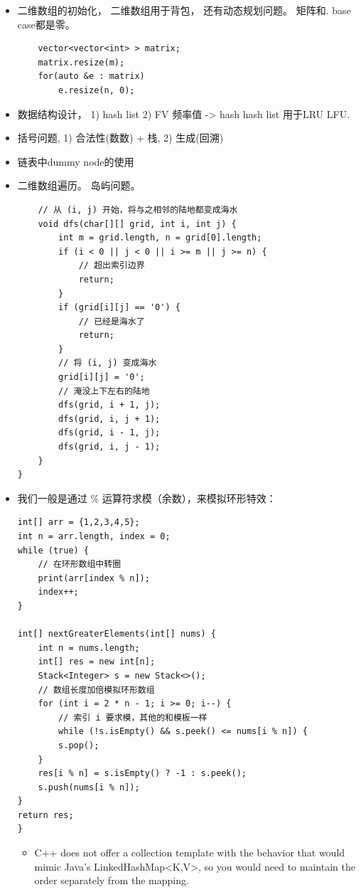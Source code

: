 \documentclass[a4paper,11pt,twoside]{book}
\begin{document}
\begin{itemize}
	\item 二维数组的初始化， 二维数组用于背包， 还有动态规划问题。 矩阵和. base case都是零。

\begin{lstlisting}
	vector<vector<int> > matrix;
	matrix.resize(m);
	for(auto &e : matrix)
		e.resize(n, 0);
\end{lstlisting}

	\item 数据结构设计， 1) hash list 2) FV 频率值 -> hash  hash list 用于LRU LFU. 
	
	\item 括号问题, 1) 合法性(数数) + 栈, 2) 生成(回溯)
	
	\item 链表中dummy node的使用
	
	\item 二维数组遍历。 岛屿问题。
\begin{lstlisting}
	// 从 (i, j) 开始，将与之相邻的陆地都变成海⽔
	void dfs(char[][] grid, int i, int j) {
		int m = grid.length, n = grid[0].length;
		if (i < 0 || j < 0 || i >= m || j >= n) {
			// 超出索引边界
			return;
		}
		if (grid[i][j] == '0') {
			// 已经是海⽔了
			return;
		}
		// 将 (i, j) 变成海⽔
		grid[i][j] = '0';
		// 淹没上下左右的陆地
		dfs(grid, i + 1, j);
		dfs(grid, i, j + 1);
		dfs(grid, i - 1, j);
		dfs(grid, i, j - 1);
	}
}
\end{lstlisting}

\item 我们一般是通过 \% 运算符求模（余数），来模拟环形特效：
\begin{lstlisting}
int[] arr = {1,2,3,4,5};
int n = arr.length, index = 0;
while (true) {
	// 在环形数组中转圈
	print(arr[index % n]);
	index++;
}

int[] nextGreaterElements(int[] nums) {
	int n = nums.length;
	int[] res = new int[n];
	Stack<Integer> s = new Stack<>();
	// 数组长度加倍模拟环形数组
	for (int i = 2 * n - 1; i >= 0; i--) {
		// 索引 i 要求模，其他的和模板一样
		while (!s.isEmpty() && s.peek() <= nums[i % n]) {
		s.pop();
	}
	res[i % n] = s.isEmpty() ? -1 : s.peek();
	s.push(nums[i % n]);
}
return res;
}
\end{lstlisting}

\fi

\begin{itemize}
	
\item C++ does not offer a collection template with the behavior that would mimic Java's LinkedHashMap<K,V>, so you would need to maintain the order separately from the mapping.


\end{itemize}
\end{itemize}
\end{document}
